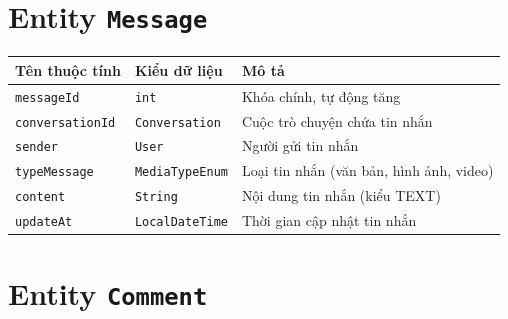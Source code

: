 \section{Entity \texttt{Message}}

\begin{longtable}{|>{\raggedright\arraybackslash}p{4cm}|>{\raggedright\arraybackslash}p{4cm}|>{\raggedright\arraybackslash}p{6cm}|}
\hline
\textbf{Tên thuộc tính} & \textbf{Kiểu dữ liệu} & \textbf{Mô tả} \\
\hline
\texttt{messageId} & \texttt{int} & Khóa chính, tự động tăng \\
\hline
\texttt{conversationId} & \texttt{Conversation} & Cuộc trò chuyện chứa tin nhắn \\
\hline
\texttt{sender} & \texttt{User} & Người gửi tin nhắn \\
\hline
\texttt{typeMessage} & \texttt{MediaTypeEnum} & Loại tin nhắn (văn bản, hình ảnh, video) \\
\hline
\texttt{content} & \texttt{String} & Nội dung tin nhắn (kiểu TEXT) \\
\hline
\texttt{updateAt} & \texttt{LocalDateTime} & Thời gian cập nhật tin nhắn \\
\hline
\end{longtable}

\section{Entity \texttt{Comment}}

